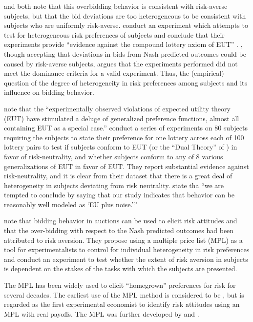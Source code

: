 \documentclass[../main.tex]{subfiles}
\begin{document}
\textcite[160]{Cox1985} and \textcite[749]{Harrison1989} both note that this overbidding behavior is consistent with risk-averse subjects, but that the bid deviations are too heterogeneous to be consistent with subjects who are uniformly risk-averse.
\textcite{Cox1985} conduct an experiment which attempts to test for heterogeneous risk preferences of subjects and conclude that their experiments provide \enquote{evidence against the compound lottery axiom of EUT} \parencite[165]{Cox1985}.
\textcite{Harrison1989}, though accepting that deviations in bids from Nash predicted outcomes could be caused by risk-averse subjects, argues that the experiments performed did not meet the dominance criteria for a valid experiment.
Thus, the (empirical) question of the degree of heterogeneity in risk preferences among subjects and its influence on bidding behavior.

\textcite[1291]{Hey1994} note that the \enquote{experimentally observed violations of expected utility theory (EUT) have stimulated a deluge of generalized preference functions, almost all containing  EUT as a special case.}
\textcite{Hey1994} conduct a series of experiments on 80 subjects requiring the subjects to state their preference for one lottery across each of 100 lottery pairs to test if subjects conform to EUT (or the \enquote{Dual Theory} of \textcite{Yaari1987}) in favor of risk-neutrality, and whether subjects conform to any of 8 various generalizations of EUT in favor of EUT.
They report substantial evidence against risk-neutrality, and it is clear from their dataset that there is a great deal of heterogeneity in subjects deviating from risk neutrality.
\textcite[1322]{Hey1994} state tha \enquote{we are tempted to conclude by saying that our study indicates that behavior can be reasonably well modeled \textelp{} as \enquote{EU plus noise.}}

\textcite[1644]{Holt2002} note that bidding behavior in auctions can be used to elicit risk attitudes and that the over-bidding with respect to the Nash predicted outcomes had been attributed to risk aversion.
They propose using a multiple price list (MPL) as a tool for experimentalists to control for individual heterogeneity in risk preferences and conduct an experiment to test whether the extent of risk aversion in subjects is dependent on the stakes of the tasks with which the subjects are presented.
 
The MPL has been widely used to elicit \enquote{homegrown} preferences for risk for several decades.
The earliest use of the MPL method is considered to be \textcite{Miller1969}, but \textcite{Binswanger1980, Binswanger1981} is regarded as the first experimental economist to identify risk attitudes using an MPL with real payoffs.
The MPL was further developed by \textcite{Schubert1999} and \textcite{Holt2002}.
\end{document}
